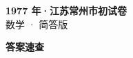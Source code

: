 \documentclass[zihao=-4, a4paper]{ctexart}
\begin{document}
\begin{center}
  {\Large\bfseries 1977 年·江苏常州市初试卷}\\[4pt]
  {\large 数学 · 简答版}
\end{center}
\medskip
{}

\clearpage
{}
\begin{center}{\Large\bfseries 答案速查}\end{center}
\medskip

\end{document}
